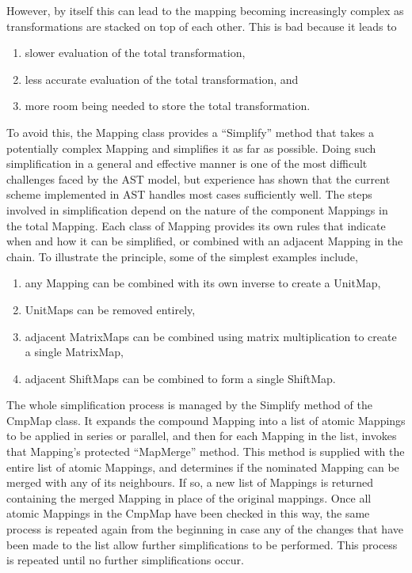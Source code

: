 \documentclass[final,authoryear,5p,times,twocolumn]{elsarticle}
\begin{document}
However, by itself this can lead to the mapping becoming increasingly
complex as transformations are stacked on top of each other. This is
bad because it leads to
\begin{enumerate}
\item slower evaluation of the total transformation,
 \item less accurate evaluation of the total
transformation, and
\item more room being needed to store the total
transformation.
\end{enumerate}
To avoid this, the Mapping class provides a
``Simplify'' method that takes a potentially complex Mapping and
simplifies it as far as possible. Doing such simplification in a
general and effective manner is one of the most difficult challenges
faced by the AST model, but experience has shown that the current
scheme implemented in AST handles most cases sufficiently well. The
steps involved in simplification depend on the nature of the component
Mappings in the total Mapping. Each class of Mapping provides its own
rules that indicate when and how it can be simplified, or combined
with an adjacent Mapping in the chain. To illustrate the principle,
some of the simplest examples include,
\begin{enumerate}
 \item any Mapping can be combined with its own inverse to create a
   UnitMap,
\item UnitMaps can be removed entirely,
\item adjacent MatrixMaps can be combined using matrix
multiplication to create a single MatrixMap,
\item adjacent ShiftMaps can be combined to form a single ShiftMap.
\end{enumerate}

The whole simplification process is managed by the Simplify method of
the CmpMap class. It expands the compound Mapping into a list of
atomic Mappings to be applied in series or parallel, and then for each
Mapping in the list, invokes that Mapping’s protected ``MapMerge''
method. This method is supplied with the entire list of atomic
Mappings, and determines if the nominated Mapping can be merged with
any of its neighbours. If so, a new list of Mappings is returned
containing the merged Mapping in place of the original mappings. Once
all atomic Mappings in the CmpMap have been checked in this way, the
same process is repeated again from the beginning in case any of the
changes that have been made to the list allow further simplifications
to be performed. This process is repeated until no further
simplifications occur.
\end{document}
